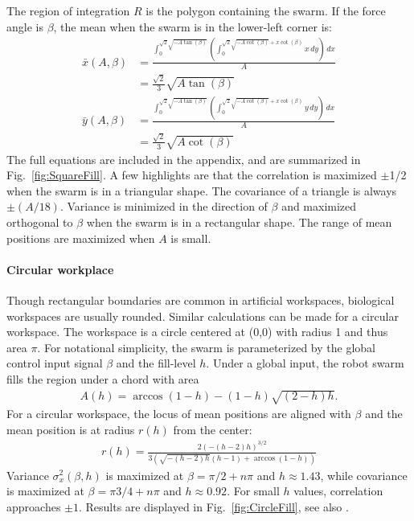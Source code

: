 The region of integration $R$ is the polygon containing the swarm. If the force angle is $\beta$, the mean when the swarm is in the lower-left corner is:
\begin{align}\label{eq:meanInSquareWorkspaceLL}
\bar{x}(A,\beta) &= \frac{\int_0^{\sqrt{2} \sqrt{-A \tan (\beta )}} \left(\int_0^{\sqrt{2} \sqrt{-A \cot (\beta )}+x \cot (\beta )} x \, dy\right) \, dx}{A} \nonumber \\
	&=\frac{ \sqrt{2}}{3} \sqrt{A \tan (\beta )}\\
\bar{y}(A,\beta) &= \frac{\int_0^{\sqrt{2} \sqrt{-A \tan (\beta )}} \left(\int_0^{\sqrt{2} \sqrt{-A \cot (\beta )}+x \cot (\beta )} y \, dy\right) \, dx}{A} \nonumber\\
	&=\frac{\sqrt{2}}{3}  \sqrt{A \cot (\beta )}
\end{align}
The full equations are included in the appendix, and are summarized in Fig.~\ref{fig:SquareFill}. A few highlights are that the correlation is maximized $\pm$1/2 when the swarm is in a triangular shape. The covariance of a triangle is always $\pm(A/18)$. Variance is minimized in the direction of $\beta$ and maximized orthogonal to $\beta$ when the swarm is in a rectangular shape. The range of mean positions are maximized when $A$ is small.

\paragraph{Circular workplace}
Though rectangular boundaries are common in artificial workspaces, biological workspaces are usually rounded.
Similar calculations can be made for a circular workspace.  The workspace is a circle centered at (0,0) with radius 1 and thus area $\pi$.
For notational simplicity, the swarm is parameterized by the global control input signal $\beta$ and the fill-level $h$.  
Under a global input, the robot swarm fills the region under a chord with area
\begin{align}
A(h) = \arccos(1-h)-(1-h) \sqrt{(2-h) h}.
\end{align}
For a circular workspace, the locus of mean positions are aligned with $\beta$ and the mean position is at radius $r(h)$ from the center:
\begin{align}
r(h) = \frac{2 (-(h-2) h)^{3/2}}{3 \left(\sqrt{-(h-2) h} (h-1)+\arccos(1-h)\right)}
\end{align}
Variance $\sigma^2_x(\beta,h)$ is maximized at $\beta = \pi/2+n \pi$ and $h\approx1.43$, while covariance is maximized at $\beta = \pi3/4+n \pi$ and $h\approx0.92.$ For small $h$ values, correlation approaches $\pm1$. Results are displayed in Fig.~\ref{fig:CircleFill}, see also \citep{Zhao2016mathematica}.

